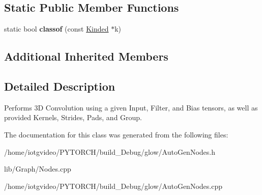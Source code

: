 \subsection*{Static Public Member Functions}
\begin{DoxyCompactItemize}
\item 
\mbox{\label{classglow_1_1_convolution3_d_node_a57f3f3873989a9c75ccc0df791166382}} 
static bool {\bfseries classof} (const \hyperlink{classglow_1_1_kinded}{Kinded} $\ast$k)
\end{DoxyCompactItemize}
\subsection*{Additional Inherited Members}


\subsection{Detailed Description}
Performs 3D Convolution using a given Input, Filter, and Bias tensors, as well as provided Kernels, Strides, Pads, and Group. 

The documentation for this class was generated from the following files\+:\begin{DoxyCompactItemize}
\item 
/home/iotgvideo/\+P\+Y\+T\+O\+R\+C\+H/build\+\_\+\+Debug/glow/Auto\+Gen\+Nodes.\+h\item 
lib/\+Graph/Nodes.\+cpp\item 
/home/iotgvideo/\+P\+Y\+T\+O\+R\+C\+H/build\+\_\+\+Debug/glow/Auto\+Gen\+Nodes.\+cpp\end{DoxyCompactItemize}
